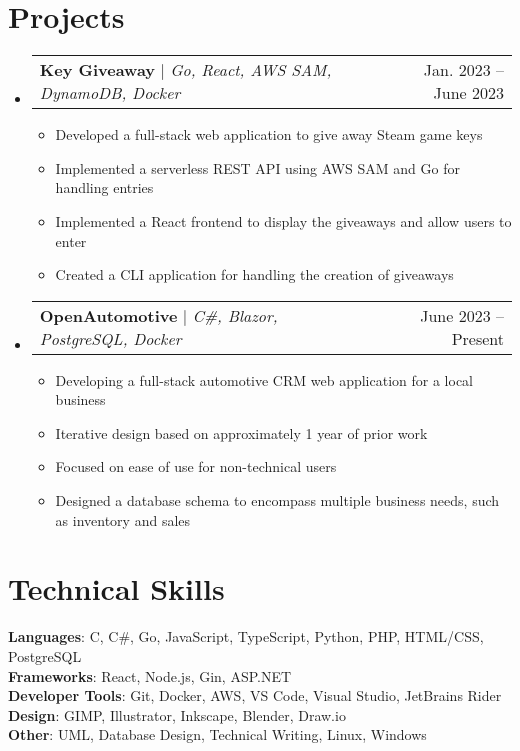 \documentclass[letterpaper,11pt]{article}
\makeatletter
\newcommand{\resumeItem}[1]{
  \item\small{
    {#1 \vspace{-2pt}}
  }
}
\newcommand{\resumeProjectHeading}[2]{
    \item
    \begin{tabular*}{0.97\textwidth}{l@{\extracolsep{\fill}}r}
      \small#1 & #2 \\
    \end{tabular*}\vspace{-7pt}
}
\newcommand{\resumeSubHeadingListStart}{\begin{itemize}[leftmargin=0.15in, label={}]}
\newcommand{\resumeSubHeadingListEnd}{\end{itemize}}
\newcommand{\resumeItemListStart}{\begin{itemize}}
\newcommand{\resumeItemListEnd}{\end{itemize}\vspace{-5pt}}
\makeatother
\begin{document}
\section{Projects}
    \resumeSubHeadingListStart
      \resumeProjectHeading
          {\textbf{Key Giveaway} $|$ \emph{Go, React, AWS SAM, DynamoDB, Docker}}{Jan. 2023 -- June 2023}
          \resumeItemListStart
            \resumeItem{Developed a full-stack web application to give away Steam game keys}
            \resumeItem{Implemented a serverless REST API using AWS SAM and Go for handling entries}
            \resumeItem{Implemented a React frontend to display the giveaways and allow users to enter}
            \resumeItem{Created a CLI application for handling the creation of giveaways}
          \resumeItemListEnd
      \resumeProjectHeading
          {\textbf{OpenAutomotive} $|$ \emph{C\#, Blazor, PostgreSQL, Docker}}{June 2023 -- Present}
          \resumeItemListStart
            \resumeItem{Developing a full-stack automotive CRM web application for a local business}
            \resumeItem{Iterative design based on approximately 1 year of prior work}
            \resumeItem{Focused on ease of use for non-technical users}
            \resumeItem{Designed a database schema to encompass multiple business needs, such as inventory and sales}
          \resumeItemListEnd
    \resumeSubHeadingListEnd



%
\section{Technical Skills}
 \begin{itemize}[leftmargin=0.15in, label={}]
    \small{\item{
     \textbf{Languages}{: C, C\#, Go, JavaScript, TypeScript, Python, PHP, HTML/CSS, PostgreSQL} \\
     \textbf{Frameworks}{: React, Node.js, Gin, ASP.NET} \\
     \textbf{Developer Tools}{: Git, Docker, AWS, VS Code, Visual Studio, JetBrains Rider} \\
     \textbf{Design}{: GIMP, Illustrator, Inkscape, Blender, Draw.io} \\
     \textbf{Other}{: UML, Database Design, Technical Writing, Linux, Windows}
    }}
 \end{itemize}


\end{document}

